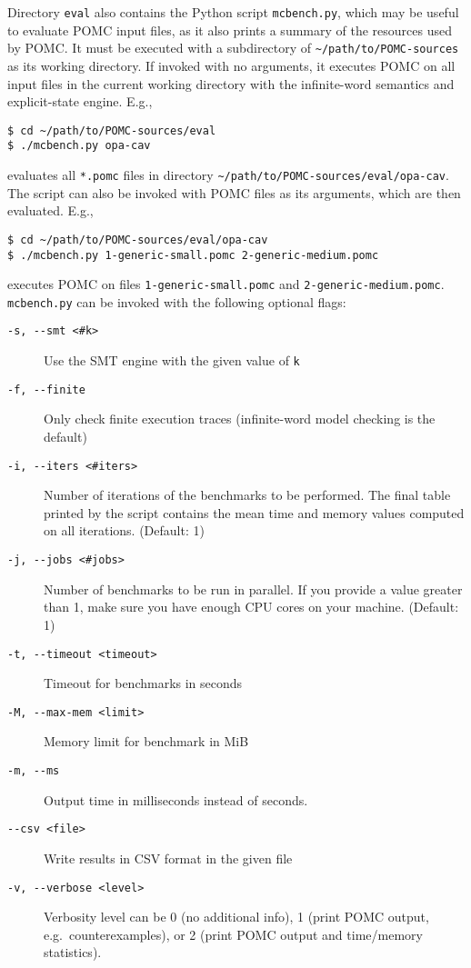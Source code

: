 \documentclass[9pt,a4paper]{article}
\begin{document}
Directory \verb|eval| also contains the Python script \verb|mcbench.py|,
which may be useful to evaluate POMC input files, as it also prints
a summary of the resources used by POMC.
It must be executed with a subdirectory of \verb|~/path/to/POMC-sources|
as its working directory.
If invoked with no arguments, it executes POMC on all input files in the current
working directory with the infinite-word semantics and explicit-state engine.
E.g.,
\begin{verbatim}
$ cd ~/path/to/POMC-sources/eval
$ ./mcbench.py opa-cav
\end{verbatim}
evaluates all \verb|*.pomc| files in directory \verb|~/path/to/POMC-sources/eval/opa-cav|.
The script can also be invoked with POMC files as its arguments,
which are then evaluated. E.g.,
\begin{verbatim}
$ cd ~/path/to/POMC-sources/eval/opa-cav
$ ./mcbench.py 1-generic-small.pomc 2-generic-medium.pomc
\end{verbatim}
executes POMC on files \verb|1-generic-small.pomc| and \verb|2-generic-medium.pomc|.
\texttt{mcbench.py} can be invoked with the following optional flags:
\begin{description}
\item[\texttt{-s, -{}-smt <\#k>}]
  Use the SMT engine with the given value of \verb|k|
\item[\texttt{-f, -{}-finite}]
  Only check finite execution traces (infinite-word model checking is the default)
\item[\texttt{-i, -{}-iters <\#iters>}]
  Number of iterations of the benchmarks to be performed.
  The final table printed by the script contains the mean time
  and memory values computed on all iterations. (Default: 1)
\item[\texttt{-j, -{}-jobs <\#jobs>}]
  Number of benchmarks to be run in parallel.
  If you provide a value greater than 1, make sure you have
  enough CPU cores on your machine.
  (Default: 1)
\item[\texttt{-t, -{}-timeout <timeout>}]
  Timeout for benchmarks in seconds
\item[\texttt{-M, -{}-max-mem <limit>}]
  Memory limit for benchmark in MiB
\item[\texttt{-m, -{}-ms}]
  Output time in milliseconds instead of seconds.
\item[\texttt{-{}-csv <file>}]
  Write results in CSV format in the given file
\item[\texttt{-v, -{}-verbose <level>}]
  Verbosity level can be 0 (no additional info),
  1 (print POMC output, e.g.\ counterexamples), or
  2 (print POMC output and time/memory statistics).
\end{description}
\end{document}
